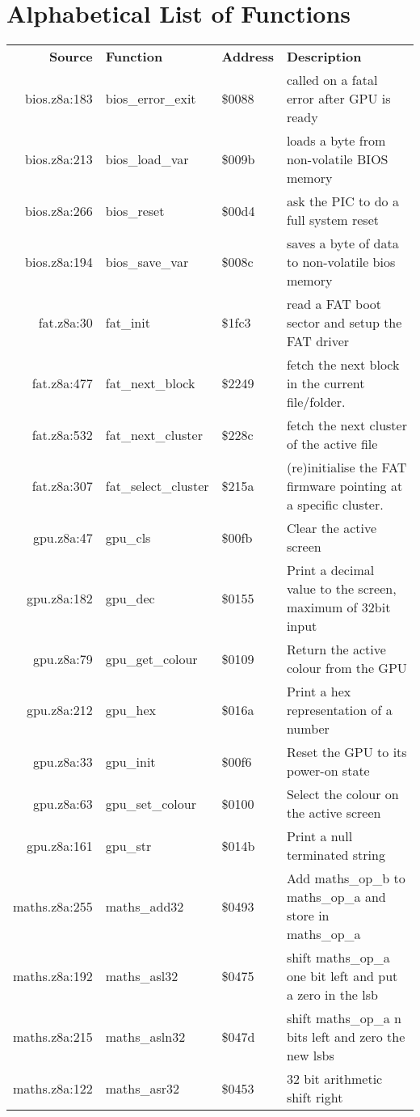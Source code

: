 \section{Alphabetical List of Functions}
\begin{tabular}{rllp{7cm}}
 \textbf{Source}&\textbf{Function}&\textbf{Address}&\textbf{Description}\\
 bios.z8a:183&bios\_error\_exit&\$0088&called on a fatal error after GPU is ready\\
 bios.z8a:213&bios\_load\_var&\$009b&loads a byte from non-volatile BIOS memory\\
 bios.z8a:266&bios\_reset&\$00d4&ask the PIC to do a full system reset\\
 bios.z8a:194&bios\_save\_var&\$008c&saves a byte of data to non-volatile bios memory\\
 fat.z8a:30&fat\_init&\$1fc3&read a FAT boot sector and setup the FAT driver\\
 fat.z8a:477&fat\_next\_block&\$2249&fetch the next block in the current file/folder.\\
 fat.z8a:532&fat\_next\_cluster&\$228c&fetch the next cluster of the active file\\
 fat.z8a:307&fat\_select\_cluster&\$215a&(re)initialise the FAT firmware pointing at a specific cluster.\\
 gpu.z8a:47&gpu\_cls&\$00fb&Clear the active screen\\
 gpu.z8a:182&gpu\_dec&\$0155&Print a decimal value to the screen, maximum of 32bit input\\
 gpu.z8a:79&gpu\_get\_colour&\$0109&Return the active colour from the GPU\\
 gpu.z8a:212&gpu\_hex&\$016a&Print a hex representation of a number\\
 gpu.z8a:33&gpu\_init&\$00f6&Reset the GPU to its power-on state\\
 gpu.z8a:63&gpu\_set\_colour&\$0100&Select the colour on the active screen\\
 gpu.z8a:161&gpu\_str&\$014b&Print a null terminated string\\
 maths.z8a:255&maths\_add32&\$0493&Add maths\_op\_b to maths\_op\_a and store in maths\_op\_a\\
 maths.z8a:192&maths\_asl32&\$0475&shift maths\_op\_a one bit left and put a zero in the lsb\\
 maths.z8a:215&maths\_asln32&\$047d&shift maths\_op\_a n bits left and zero the new lsbs\\
 maths.z8a:122&maths\_asr32&\$0453&32 bit arithmetic shift right\\

\end{tabular}
